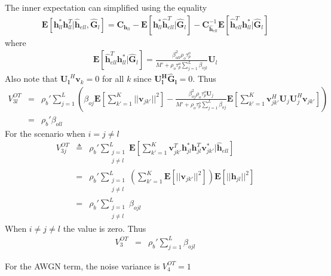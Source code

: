 \documentclass[10pt, a4paper, twoside,fleqn]{article}
\begin{document}
The inner expectation can simplified using the equality \cite{bib:rmtBook}
\begin{eqnarray}
	\pmb{E}[\pmb{h}_{ll}^*\pmb{h}^T_{ll}|\pmb{\hat h}_{ell}, \pmb{\hat G}_{l}] = \pmb{C}_{\pmb{h}_{ll}}-\pmb{E}[\pmb{h}_{ll}^* \pmb{\hat h}^T_{ell}| \pmb{\hat G}_{l}] - \pmb{C}_{\pmb{\hat h}_{ell}}^{-1}\pmb{E}[\pmb{\hat h}_{ell}^T \pmb{h}_{ll}^*| \pmb{\hat G}_{l}]
\end{eqnarray}
where
\begin{eqnarray}
	\pmb{E}[\pmb{\hat h}_{ell}^T \pmb{h}_{ll}^*| \pmb{\hat G}_{l}] = \frac{\beta_{oll}^{2}\rho_o\tau_p^o}{M'+\rho_o\tau_p^o\sum\limits_{j=1}^{L}\beta_{ojl}}\pmb{U}_l
\end{eqnarray}
Also note that $\pmb{U_l}^H\pmb{v}_k=0$ for all $k$ since $\pmb{U_l^H}\pmb{\hat G_l}=0$. Thus
\begin{eqnarray}\label{eqn:otv3}
	V_{3l}^{OT} &=& \rho_b' \sum_{j=1}^{L} \left( \beta_{oj} \pmb{E}\left[\sum_{k'=1}^{K}||\pmb{v}_{jk'}||^2\right]
					- \frac{\beta_{oj}^{2}\rho_o\tau_p^o\pmb{U}_j}{M'+\rho_o\tau_p^o\sum\limits_{j=1}^{L}\beta_{oj}} \pmb{E}\left[\sum_{k'=1}^{K} \pmb{v}_{jk'}^H \pmb{U}_j \pmb{U}_j^H \pmb{v}_{jk'}\right]\right) \nonumber \\
        &=& \rho_b'\beta_{oll}
\end{eqnarray}
For the scenario when $i=j\neq l$
\begin{eqnarray}\label{eqn:v3jot}
V_{3j}^{OT} &\triangleq& \rho_b' \sum_{\substack{j=1 \\ j\neq l}}^{L} \pmb{E}\left[\sum_{k'=1}^{K} \pmb{v}_{jk'}^T \pmb{h}_{jl}^*  \pmb{h}_{jl}^T \pmb{v}_{jk'}^*| \pmb{\hat h}_{ell} \right] \nonumber \\
           &=&  \rho_b' \sum_{\substack{j=1 \\ j\neq l}}^{L}\left(\sum_{k'=1}^{K} \pmb{E}\left[||\pmb{v}_{jk'}||^2\right]\right)\pmb{E}\left[ ||\pmb{h}_{jl}||^2\right] \nonumber \\
           &=&\rho_b' \sum_{\substack{j=1 \\ j\neq l}}^{L}\beta_{ojl}
\end{eqnarray}
When $i\neq j\neq l$ the value is zero. Thus
\begin{eqnarray}
V_3^{OT} &=&\rho_b' \sum_{j=1}^{L}\beta_{ojl}
\end{eqnarray}

For the AWGN term, the noise variance is $V_4^{OT} = 1$
\end{document}
